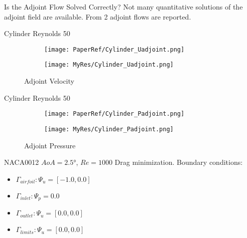 \begin{frame}{Is the Adjoint Flow Solved Correctly?}
Not many quantitative solutions of the adjoint field are available.
From  2 adjoint flows are reported.    
\end{frame}


\begin{frame}{Cylinder Reynolds 50}
    \begin{figure}[h]
        \centering          
        \begin{subfigure}[h]{0.45\textwidth}
                 \centering
            \texttt{[image: PaperRef/Cylinder\_Uadjoint.png]}
       \end{subfigure}
       \hfill	
       \begin{subfigure}[h]{0.45\textwidth}
                \centering
           \texttt{[image: MyRes/Cylinder\_Uadjoint.png]}
        \end{subfigure}
        \caption{Adjoint Velocity}
        \end{figure} 
    \end{frame}
    
    \begin{frame}{Cylinder Reynolds 50}
    \begin{figure}[h]
        \centering          
        \begin{subfigure}[h]{0.45\textwidth}
                 \centering
            \texttt{[image: PaperRef/Cylinder\_Padjoint.png]}
       \end{subfigure}
       \hfill	
       \begin{subfigure}[h]{0.45\textwidth}
                \centering
           \texttt{[image: MyRes/Cylinder\_Padjoint.png]}
        \end{subfigure}
        \caption{Adjoint Pressure}
        \end{figure} 
    \end{frame}

\begin{frame}{NACA0012 $AoA=\ang{2.5}$, $Re=1000$}
Drag minimization.
Boundary conditions:
\begin{itemize}
    \item $\Gamma_{airfoil}: \Psi_u = [-1.0, 0.0]$
    \item $\Gamma_{inlet}:\Psi_p = 0.0$
    \item $\Gamma_{outlet}: \Psi_u = [0.0, 0.0]$
    \item $\Gamma_{limits}: \Psi_u = [0.0, 0.0]$

\end{itemize}
        
\end{frame}

